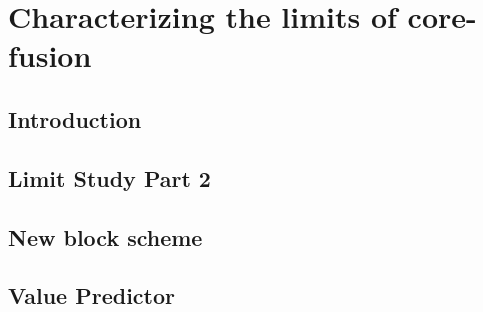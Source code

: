 \chapter{Characterizing the limits of core-fusion}

\section{Introduction}\label{sect:introduction-chapter3}

\section{Limit Study Part 2}

\section{New block scheme}

\section{Value Predictor}

%
%
%